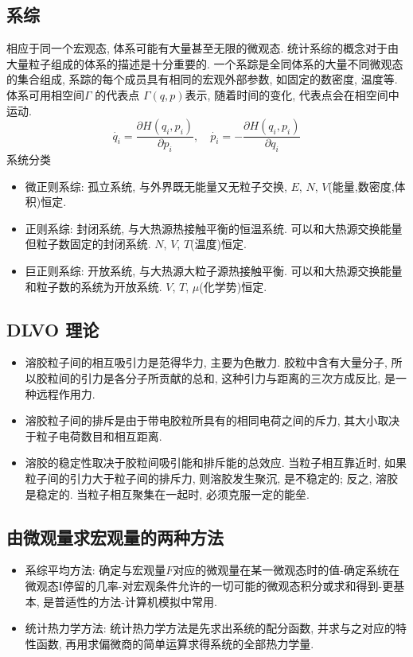 \documentclass[a4paper,titlepage,twocolumn]{article}
\begin{document}
\subsection{系综}
相应于同一个宏观态, 体系可能有大量甚至无限的微观态. 统计系综的概念对于由大量粒子组成的体系的描述是十分重要的. 一个系踪是全同体系的大量不同微观态的集合组成, 系踪的每个成员具有相同的宏观外部参数, 如固定的数密度, 温度等. 体系可用相空间$\Gamma$
的代表点 $\Gamma(q,p)$表示, 随着时间的变化, 代表点会在相空间中运动.
\[
\dot{q_i} = \frac{\partial H(q_i,p_i)}{\partial p_i},\quad 
\dot{p_i}=-\frac{\partial H(q_i,p_i)}{\partial q_i}
\]
系统分类
\begin{itemize}
\item 微正则系综: 孤立系统, 与外界既无能量又无粒子交换, $E$, $N$, $V$(能量,数密度,体积)恒定.
\item 正则系综: 封闭系统, 与大热源热接触平衡的恒温系统. 可以和大热源交换能量但粒子数固定的封闭系统. $N$, $V$, $T$(温度)恒定.
\item 巨正则系综: 开放系统, 与大热源大粒子源热接触平衡. 可以和大热源交换能量和粒子数的系统为开放系统. $V$, $T$, $\mu$(化学势)恒定.
\end{itemize}


\subsection{DLVO 理论}
\begin{itemize}
\item 溶胶粒子间的相互吸引力是范得华力, 主要为色散力. 胶粒中含有大量分子, 所以胶粒间的引力是各分子所贡献的总和, 这种引力与距离的三次方成反比, 是一种远程作用力.
\item 溶胶粒子间的排斥是由于带电胶粒所具有的相同电荷之间的斥力, 其大小取决于粒子电荷数目和相互距离.
\item 溶胶的稳定性取决于胶粒间吸引能和排斥能的总效应. 当粒子相互靠近时, 如果粒子间的引力大于粒子间的排斥力, 则溶胶发生聚沉, 是不稳定的; 反之, 溶胶是稳定的. 当粒子相互聚集在一起时, 必须克服一定的能垒.
\end{itemize}

\subsection{由微观量求宏观量的两种方法}
\begin{itemize}
\item 系综平均方法: 确定与宏观量$F$对应的微观量在某一微观态时的值-确定系统在微观态I停留的几率-对宏观条件允许的一切可能的微观态积分或求和得到-更基本, 是普适性的方法-计算机模拟中常用.

\item 统计热力学方法: 统计热力学方法是先求出系统的配分函数, 并求与之对应的特性函数, 再用求偏微商的简单运算求得系统的全部热力学量.
\end{itemize}
\end{document}
